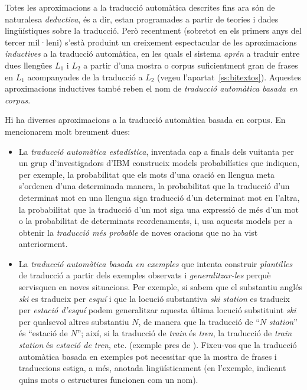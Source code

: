 Totes les aproximacions a la traducció automàtica descrites fins ara
són de naturalesa \emph{deductiva}, és a dir, estan programades a
partir de teories i dades lingüístiques sobre la traducció. Però
recentment (sobretot en els primers anys del tercer mil·leni) s'està
produint un creixement espectacular de les aproximacions
\emph{inductives} a la traducció automàtica, en les quals el sistema
\emph{aprén} a traduir entre dues llengües $L_1$ i $L_2$ a partir
d'una mostra o corpus suficientment gran de frases en $L_1$
acompanyades de la traducció a $L_2$ (vegeu
l'apartat~\ref{ss:bitextos}). Aquestes aproximacions inductives també
reben el nom de \emph{traducció automàtica basada en corpus}.

Hi ha diverses aproximacions a la traducció automàtica basada en
corpus. En mencionarem molt breument dues:
\begin{itemize}
\item La \emph{traducció automàtica estadística},
inventada cap a finals dels vuitanta per un grup d'investigadors d'IBM
\citep{brown90j} construeix models probabilístics que indiquen, per
exemple, la probabilitat que els mots d'una oració en llengua meta
s'ordenen d'una determinada manera, la probabilitat que la traducció
d'un determinat mot en una llengua siga traducció d'un determinat mot
en l'altra, la probabilitat que la traducció d'un mot siga una
expressió de més d'un mot o la probabilitat de determinats
reordenaments, i, usa aquests models per a obtenir la \emph{traducció
  més probable} de noves oracions que no ha vist anteriorment. 
\item La \emph{traducció automàtica basada en exemples} que intenta
construir \emph{plantilles} de traducció a partir dels exemples
observats i \emph{generalitzar-les} perquè servisquen en noves
situacions. Per exemple, si sabem que el substantiu anglés \emph{ski}
es tradueix per \emph{esquí} i que la locució substantiva \emph{ski
  station} es tradueix per \emph{estació d'esquí} podem generalitzar
aquesta última locució substituint \emph{ski} per qualsevol altres
substantiu $N$, de manera que la traducció de ``$N$ \emph{station}''
és ``estació de $N$''; així, si la traducció de \emph{train} és
\emph{tren}, la traducció de \emph{train station} és \emph{estació de
  tren}, etc. (exemple pres de \citealt{carl01j}). Fixeu-vos que la traducció automàtica basada en exemples
pot necessitar que la mostra de frases i traduccions estiga, a més,
anotada lingüísticament (en l'exemple, indicant quins mots o
estructures funcionen com un nom).
\end{itemize}







